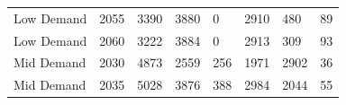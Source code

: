 \documentclass[preprint,12pt]{elsarticle}
\begin{document}
\begin{table}[h]
\begin{tabular}{llllllll}
    Low Demand                            & 2055                              & 3390                                                                                             & 3880                                                                                             & 0                                                                                                  & 2910                                                                                                               & 480                                                                                                           & 89                                                                                            \\
    Low Demand                            & 2060                              & 3222                                                                                             & 3884                                                                                             & 0                                                                                                  & 2913                                                                                                               & 309                                                                                                           & 93                                                                                            \\
    Mid Demand                            & 2030                              & 4873                                                                                             & 2559                                                                                             & 256                                                                                                & 1971                                                                                                               & 2902                                                                                                          & 36                                                                                            \\
    Mid Demand                            & 2035                              & 5028                                                                                             & 3876                                                                                             & 388                                                                                                & 2984                                                                                                               & 2044                                                                                                          & 55                                                                                            \\

\end{tabular}
\end{table}
\end{document}
